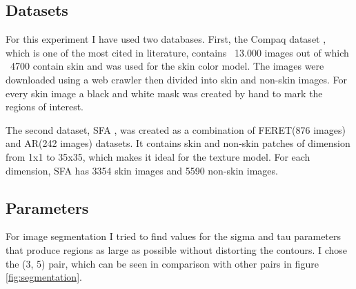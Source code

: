 \documentclass[12pt]{report}
\begin{document}
	\subsection{Datasets}
	For this experiment I have used two databases. First, the Compaq dataset \cite{compaq}, which is one of the most cited in literature, contains ~13.000 images out of which ~4700 contain skin and was used for the skin color model. The images were downloaded using a web crawler then divided into skin and non-skin images. For every skin image a black and white mask was created by hand to mark the regions of interest.
	
	The second dataset, SFA \cite{sfa}, was created as a combination of FERET(876 images) and AR(242 images)  datasets. It contains skin and non-skin patches of dimension from 1x1 to 35x35, which makes it ideal for the texture model. For each dimension, SFA has 3354 skin images and 5590 non-skin images.
	
	\subsection{Parameters}
	For image segmentation I tried to find values for the sigma and tau parameters that produce regions as large as possible without distorting the contours. I chose the (3, 5) pair, which can be seen in comparison with other pairs in figure \ref{fig:segmentation}.
	
\end{document}
